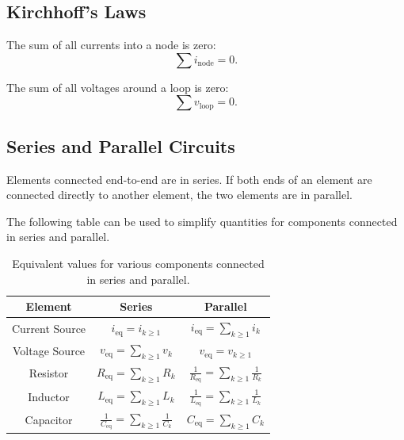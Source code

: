 \documentclass{article}
\begin{document}
\subsection{Kirchhoff's Laws}
\begin{theorem}
    The sum of all currents into a node is zero:
    \begin{equation*}
        \sum i_{\mathrm{node}} = 0.
    \end{equation*}
\end{theorem}
\begin{theorem}
    The sum of all voltages around a loop is zero:
    \begin{equation*}
        \sum v_{\mathrm{loop}} = 0.
    \end{equation*}
\end{theorem}
\subsection{Series and Parallel Circuits}
\begin{definition}
    Elements connected end-to-end are in series. If both ends of an element are connected directly to another element, the two elements are in parallel.
\end{definition}
The following table can be used to simplify quantities for components
connected in series and parallel.
\begin{table}[H]
    \centering
    \begin{tabular}{c c c}
        \toprule
        \textbf{Element} & \textbf{Series}                                                           & \textbf{Parallel}                                                         \\
        \midrule
        Current Source   & \(\displaystyle i_{\mathrm{eq}} = i_{k\geq1}\)                            & \(i_{\mathrm{eq}} = \displaystyle \sum_{k\geq1} i_k\)                     \\
        Voltage Source   & \(\displaystyle v_{\mathrm{eq}} = \sum_{k\geq1} v_k\)                     & \(\displaystyle v_{\mathrm{eq}} = v_{k\geq1}\)                            \\
        Resistor         & \(\displaystyle R_{\mathrm{eq}} = \sum_{k\geq1} R_k\)                     & \(\displaystyle \frac{1}{R_{\mathrm{eq}}} = \sum_{k\geq1} \frac{1}{R_k}\) \\
        Inductor         & \(\displaystyle L_{\mathrm{eq}} = \sum_{k\geq1} L_k\)                     & \(\displaystyle \frac{1}{L_{\mathrm{eq}}} = \sum_{k\geq1} \frac{1}{L_k}\) \\
        Capacitor        & \(\displaystyle \frac{1}{C_{\mathrm{eq}}} = \sum_{k\geq1} \frac{1}{C_k}\) & \(\displaystyle C_{\mathrm{eq}} = \sum_{k\geq1} C_k\)                     \\
        \bottomrule
    \end{tabular}
    \caption{Equivalent values for various components connected in series and parallel.}
\end{table}
\end{document}

